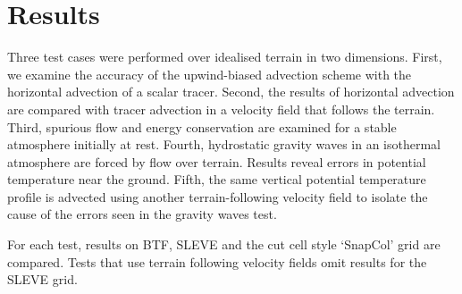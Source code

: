 \chapter{Results}
Three test cases were performed over idealised terrain in two dimensions.  First, we examine the accuracy of the upwind-biased advection scheme with the horizontal advection of a scalar tracer.  Second, the results of horizontal advection are compared with tracer advection in a velocity field that follows the terrain.  Third, spurious flow and energy conservation are examined for a stable atmosphere initially at rest.  Fourth, hydrostatic gravity waves in an isothermal atmosphere are forced by flow over terrain.  Results reveal errors in potential temperature near the ground.  Fifth, the same vertical potential temperature profile is advected using another terrain-following velocity field to isolate the cause of the errors seen in the gravity waves test.

For each test, results on BTF, SLEVE and the cut cell style `SnapCol' grid are compared.  Tests that use terrain following velocity fields omit results for the SLEVE grid.






